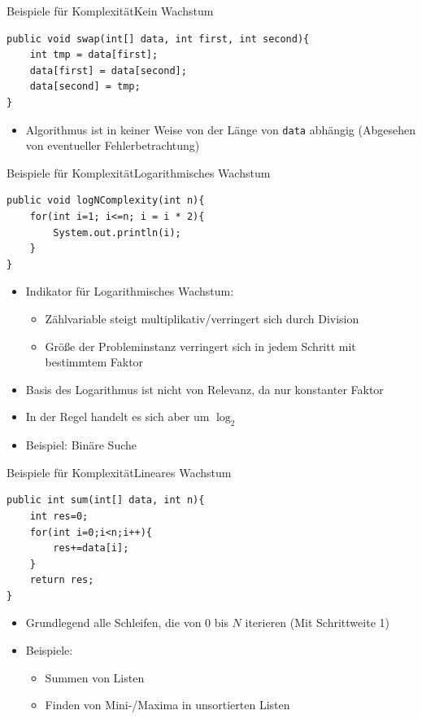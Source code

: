 \begin{frame}[fragile]{Beispiele für Komplexität}{Kein Wachstum}
\lstset{style=java}
\begin{lstlisting}
public void swap(int[] data, int first, int second){
    int tmp = data[first];
    data[first] = data[second];
    data[second] = tmp;
}
\end{lstlisting}
\begin{itemize}
    \item Algorithmus ist in keiner Weise von der Länge von \texttt{data} abhängig (Abgesehen von eventueller Fehlerbetrachtung)
\end{itemize}
\end{frame}

\begin{frame}[fragile]{Beispiele für Komplexität}{Logarithmisches Wachstum}
\lstset{style=java}
\begin{lstlisting}
public void logNComplexity(int n){
    for(int i=1; i<=n; i = i * 2){
        System.out.println(i);
    }
}
\end{lstlisting}
\begin{itemize}
    \item Indikator für Logarithmisches Wachstum:
    \begin{itemize}
        \item Zählvariable steigt multiplikativ/verringert sich durch Division
        \item Größe der Probleminstanz verringert sich in jedem Schritt mit bestimmtem Faktor
    \end{itemize}
    \item Basis des Logarithmus ist nicht von Relevanz, da nur konstanter Faktor
    \item In der Regel handelt es sich aber um $\log_2$
    \item Beispiel: Binäre Suche
\end{itemize}
\end{frame}

\begin{frame}[fragile]{Beispiele für Komplexität}{Lineares Wachstum}
\lstset{style=java}
\begin{lstlisting}
public int sum(int[] data, int n){
    int res=0;
    for(int i=0;i<n;i++){
        res+=data[i];
    }
    return res;
}
\end{lstlisting}
\begin{itemize}
    \item Grundlegend alle Schleifen, die von 0 bis $N$ iterieren (Mit Schrittweite 1)
    \item Beispiele:
    \begin{itemize}
        \item Summen von Listen
        \item Finden von Mini-/Maxima in unsortierten Listen
    \end{itemize}
\end{itemize}
\end{frame}

